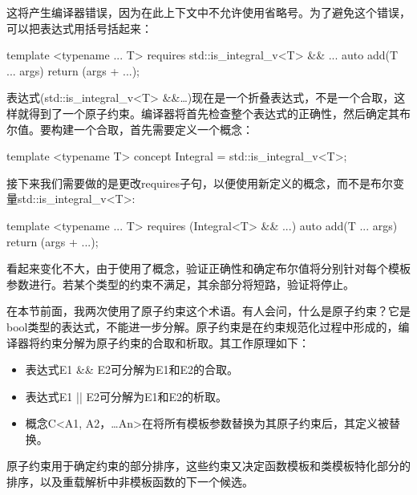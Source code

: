 这将产生编译器错误，因为在此上下文中不允许使用省略号。为了避免这个错误，可以把表达式用括号括起来：

\begin{cpp}
	template <typename ... T>
	requires std::is_integral_v<T> && ...
	auto add(T ... args)
	{
		return (args + ...);
	}
\end{cpp}

表达式(std::is\_integral\_v<T> \&\&…)现在是一个折叠表达式，不是一个合取，这样就得到了一个原子约束。编译器将首先检查整个表达式的正确性，然后确定其布尔值。要构建一个合取，首先需要定义一个概念：

\begin{cpp}
template <typename T>
concept Integral = std::is_integral_v<T>;
\end{cpp}

接下来我们需要做的是更改requires子句，以便使用新定义的概念，而不是布尔变量std::is\_integral\_v<T>:

\begin{cpp}
template <typename ... T>
requires (Integral<T> && ...)
auto add(T ... args)
{
	return (args + ...);
}
\end{cpp}

看起来变化不大，由于使用了概念，验证正确性和确定布尔值将分别针对每个模板参数进行。若某个类型的约束不满足，其余部分将短路，验证将停止。

在本节前面，我两次使用了原子约束这个术语。有人会问，什么是原子约束？它是bool类型的表达式，不能进一步分解。原子约束是在约束规范化过程中形成的，编译器将约束分解为原子约束的合取和析取。其工作原理如下：

\begin{itemize}
\item
表达式E1 \&\& E2可分解为E1和E2的合取。

\item
表达式E1 || E2可分解为E1和E2的析取。

\item
概念C<A1, A2，…An>在将所有模板参数替换为其原子约束后，其定义被替换。
\end{itemize}

原子约束用于确定约束的部分排序，这些约束又决定函数模板和类模板特化部分的排序，以及重载解析中非模板函数的下一个候选。











